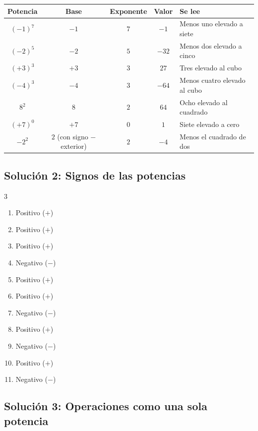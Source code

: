 \documentclass[a4paper,12pt]{article}
\begin{document}
\begin{center}
\renewcommand{\arraystretch}{1.5}
\begin{tabular}{|c|c|c|c|l|}
\hline
\textbf{Potencia} & \textbf{Base} & \textbf{Exponente} & \textbf{Valor} & \textbf{Se lee} \\ \hline
$(-1)^{7}$ & $-1$ & $7$ & $-1$ & Menos uno elevado a siete \\ \hline
$(-2)^{5}$ & $-2$ & $5$ & $-32$ & Menos dos elevado a cinco \\ \hline
$(+3)^{3}$ & $+3$ & $3$ & $27$ & Tres elevado al cubo \\ \hline
$(-4)^{3}$ & $-4$ & $3$ & $-64$ & Menos cuatro elevado al cubo \\ \hline
$8^{2}$ & $8$ & $2$ & $64$ & Ocho elevado al cuadrado \\ \hline
$(+7)^{0}$ & $+7$ & $0$ & $1$ & Siete elevado a cero \\ \hline
$-2^{2}$ & $2$ (con signo $-$ exterior) & $2$ & $-4$ & Menos el cuadrado de dos \\ \hline
\end{tabular}
\end{center}

\subsection*{Solución 2: Signos de las potencias}

\begin{multicols}{3}
\begin{enumerate}[label=\alph*)]
    \item Positivo ($+$)
    \item Positivo ($+$)
    \item Positivo ($+$)
    \item Negativo ($-$)
    \item Positivo ($+$)
    \item Positivo ($+$)
    \item Negativo ($-$)
    \item Positivo ($+$)
    \item Negativo ($-$)
    \item Positivo ($+$)
    \item Negativo ($-$)
\end{enumerate}
\end{multicols}

\subsection*{Solución 3: Operaciones como una sola potencia}
\end{document}
